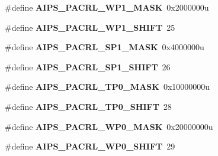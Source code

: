 \begin{DoxyCompactItemize}
\item 
\hypertarget{group___a_i_p_s___register___masks_ga906d8fa56769e12d438090dca4ebcb69}{}\#define {\bfseries A\+I\+P\+S\+\_\+\+P\+A\+C\+R\+L\+\_\+\+W\+P1\+\_\+\+M\+A\+S\+K}~0x2000000u\label{group___a_i_p_s___register___masks_ga906d8fa56769e12d438090dca4ebcb69}

\item 
\hypertarget{group___a_i_p_s___register___masks_ga73ade8625dbe5121d5e871b91c394abd}{}\#define {\bfseries A\+I\+P\+S\+\_\+\+P\+A\+C\+R\+L\+\_\+\+W\+P1\+\_\+\+S\+H\+I\+F\+T}~25\label{group___a_i_p_s___register___masks_ga73ade8625dbe5121d5e871b91c394abd}

\item 
\hypertarget{group___a_i_p_s___register___masks_gaec0ae8a4db0b0a8f69e5c6b85b85fcb5}{}\#define {\bfseries A\+I\+P\+S\+\_\+\+P\+A\+C\+R\+L\+\_\+\+S\+P1\+\_\+\+M\+A\+S\+K}~0x4000000u\label{group___a_i_p_s___register___masks_gaec0ae8a4db0b0a8f69e5c6b85b85fcb5}

\item 
\hypertarget{group___a_i_p_s___register___masks_ga2da94a2960a1befd9a63381d016eb0fa}{}\#define {\bfseries A\+I\+P\+S\+\_\+\+P\+A\+C\+R\+L\+\_\+\+S\+P1\+\_\+\+S\+H\+I\+F\+T}~26\label{group___a_i_p_s___register___masks_ga2da94a2960a1befd9a63381d016eb0fa}

\item 
\hypertarget{group___a_i_p_s___register___masks_gaefd0ffd9d4a2ba5b9700ff85ba7e6c9b}{}\#define {\bfseries A\+I\+P\+S\+\_\+\+P\+A\+C\+R\+L\+\_\+\+T\+P0\+\_\+\+M\+A\+S\+K}~0x10000000u\label{group___a_i_p_s___register___masks_gaefd0ffd9d4a2ba5b9700ff85ba7e6c9b}

\item 
\hypertarget{group___a_i_p_s___register___masks_gad4ee7c9015ca3ce0a1af0e5e6eb68cf6}{}\#define {\bfseries A\+I\+P\+S\+\_\+\+P\+A\+C\+R\+L\+\_\+\+T\+P0\+\_\+\+S\+H\+I\+F\+T}~28\label{group___a_i_p_s___register___masks_gad4ee7c9015ca3ce0a1af0e5e6eb68cf6}

\item 
\hypertarget{group___a_i_p_s___register___masks_ga2d38d55a84ecc02f53d03af165de462d}{}\#define {\bfseries A\+I\+P\+S\+\_\+\+P\+A\+C\+R\+L\+\_\+\+W\+P0\+\_\+\+M\+A\+S\+K}~0x20000000u\label{group___a_i_p_s___register___masks_ga2d38d55a84ecc02f53d03af165de462d}

\item 
\hypertarget{group___a_i_p_s___register___masks_gad463bdb994530b66aa510e16b99666b5}{}\#define {\bfseries A\+I\+P\+S\+\_\+\+P\+A\+C\+R\+L\+\_\+\+W\+P0\+\_\+\+S\+H\+I\+F\+T}~29\label{group___a_i_p_s___register___masks_gad463bdb994530b66aa510e16b99666b5}


\end{DoxyCompactItemize}
